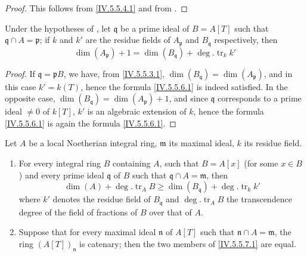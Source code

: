 \begin{proof}
This follows from \eqref{IV.5.5.4.1} and from .
\end{proof}

\begin{corollary}[5.5.6]
\label{IV.5.5.6}
Under the hypotheses of , let $\mathfrak{q}$ be a prime ideal of $B=A[T]$ such that $\mathfrak{q}\cap A=\mathfrak{p}$; if $k$ and $k'$ are the residue fields of $A_\mathfrak{p}$ and $B_\mathfrak{q}$ respectively, then
\[
\tag{5.5.6.1}\label{IV.5.5.6.1}
  \dim(A_\mathfrak{p}) + 1 = \dim(B_\mathfrak{q}) + \deg.\operatorname{tr}_k k'
\]
\end{corollary}

\begin{proof}
If $\mathfrak{q}=\mathfrak{p}B$, we have, from \eqref{IV.5.5.3.1}, $\dim(B_\mathfrak{q})=\dim(A_\mathfrak{p})$, and in this case $k'=k(T)$, hence the formula \eqref{IV.5.5.6.1} is indeed satisfied.
In the opposite case, $\dim(B_\mathfrak{q})=\dim(A_\mathfrak{p})+1$, and since $\mathfrak{q}$ corresponds to a prime ideal $\neq 0$ of $k[T]$, $k'$ is an algebraic extension of $k$, hence the formula \eqref{IV.5.5.6.1} is again the formula \eqref{IV.5.5.6.1}.
\end{proof}

\begin{lemma}[5.5.7]
\label{IV.5.5.7}
Let $A$ be a local Noetherian integral ring, $\mathfrak{m}$ its maximal ideal, $k$ its residue field.
\begin{enumerate}[label=(\roman*)]
  \item For every integral ring $B$ containing $A$, such that $B=A[x]$ (for some $x\in B$) and every prime ideal $\mathfrak{q}$ of $B$ such that $\mathfrak{q}\cap A=\mathfrak{m}$, then
\[
\tag{5.5.7.1}\label{IV.5.5.7.1}
  \dim(A) + \deg.\operatorname{tr}_A B \geq \dim(B_\mathfrak{q}) + \deg.\operatorname{tr}_k k'
\]
where $k'$ denotes the residue field of $B_\mathfrak{q}$ and $\deg.\operatorname{tr}_A B$ the transcendence degree of the field of fractions of $B$ over that of $A$.
  \item Suppose that for every maximal ideal $\mathfrak{n}$ of $A[T]$ such that $\mathfrak{n}\cap A=\mathfrak{m}$, the ring $(A[T])_\mathfrak{n}$ is catenary; then the two members of \eqref{IV.5.5.7.1} are equal.
\end{enumerate}
\end{lemma}

